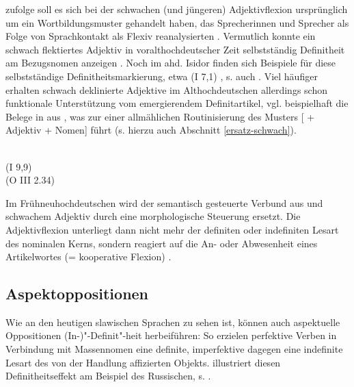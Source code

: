 \textcite[361ff.]{Braunmuller2008} zufolge soll es sich bei der schwachen (und jüngeren) Adjektivflexion ursprünglich um ein Wortbildungsmuster gehandelt haben, das Sprecherinnen und Sprecher als Folge von Sprachkontakt als Flexiv reanalysierten \parencite[zu alternativen Entstehungsszenarien s.][13-26]{Kovari1984}. Vermutlich konnte ein schwach flektiertes Adjektiv in voralthochdeutscher Zeit selbstständig Definitheit am Bezugsnomen anzeigen 
\parencites()()[69]{Demske2001}[364]{Braunmuller2008}. Noch im ahd. Isidor finden sich Beispiele für diese selbstständige Definitheitsmarkierung, etwa   (I 7,1) \parencite[226]{Braune2004}, s. auch \textcite[69f.]{Demske2001}. 
Viel häufiger erhalten schwach deklinierte Adjektive im Althochdeutschen allerdings schon funktionale Unterstützung vom emergierendem Definitartikel, vgl. beispielhaft die Belege in  aus \textcite[24,28]{Schrodt2004}, was zur einer allmählichen Routinisierung des Musters [ + Adjektiv + Nomen] führt (s. hierzu auch Abschnitt \ref{ersatz-schwach}).

\begin{exe}
	\ex \label{ex:art-adj}   
	\begin{xlist}
		\ex \label{ex:art-adj1}  \\    (I 9,9) 
		\ex \label{ex:art-adj2}   \\  (O III 2.34)
		\end{xlist}
\end{exe}
 
Im Frühneuhochdeutschen wird der semantisch gesteuerte Verbund aus  und schwachem Adjektiv durch eine morphologische Steuerung ersetzt. Die Adjektivflexion unterliegt dann nicht mehr der definiten oder indefiniten Lesart des nominalen Kerns, sondern reagiert auf die An- oder Abwesenheit eines Artikelwortes (= kooperative Flexion) \parencite[s. hierzu ausführlich][]{Demske2001,Szczepaniak2011a}. 

\subsection{Aspektoppositionen} \label{sec:aspektoppo}

Wie an den heutigen slawischen Sprachen zu sehen ist, können auch aspektuelle Oppositionen (In-)"-Definit"-heit herbeiführen: So erzielen perfektive Verben in Verbindung mit Massennomen eine definite, imperfektive dagegen eine indefinite Lesart des von der Handlung affizierten Objekts. \textcite[11ff.]{Leiss2000} illustriert diesen Definitheitseffekt am Beispiel des Russischen, s. .  

